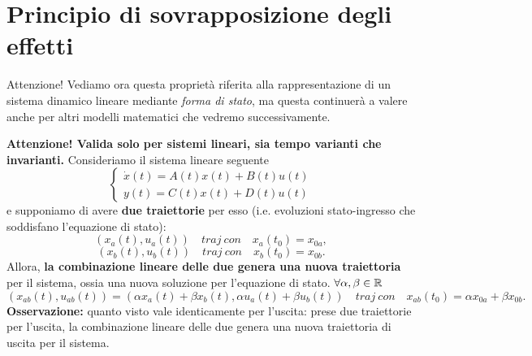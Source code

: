 \documentclass[a4paper]{report}
\begin{document}
\section{Principio di sovrapposizione degli effetti}
Attenzione! Vediamo ora questa proprietà riferita alla rappresentazione di un sistema dinamico lineare mediante\textit{ forma di stato}, ma questa continuerà a valere anche per altri modelli matematici che vedremo successivamente.
\bb
\begin{defin}{}{}
\textbf{Attenzione! Valida solo per sistemi lineari, sia tempo varianti che invarianti.}
	\bb
	Consideriamo il sistema lineare seguente
	\begin{equation*}
	\begin{cases}
		\dot x(t) = A(t)x(t) + B(t)u(t) \\
		y(t) = C(t)x(t) +D(t)u(t)
	\end{cases}
	\end{equation*}
	e supponiamo di avere \textbf{due traiettorie} per esso (i.e. evoluzioni stato-ingresso che soddisfano l'equazione di stato):
	\begin{equation*}
		(x_a(t), u_a(t))\quad traj \ con \quad  x_a(t_0)=x_{0a},
	\end{equation*}
		\begin{equation*}
		(x_b(t), u_b(t))\quad traj \ con \quad x_b(t_0)=x_{0b}.
	\end{equation*}
Allora, \textbf{la combinazione lineare delle due genera una nuova traiettoria} per il sistema, ossia una nuova soluzione per l'equazione di stato. $\forall \alpha, \beta \in \mathbb{R}$
	\begin{equation}
		(x_{ab}(t), u_{ab}(t)) = (\alpha x_a(t)+\beta x_b(t), \alpha u_a(t) + \beta u_b(t)) \quad traj \ con \quad x_{ab}(t_0) = \alpha x_{0a} + \beta x_{0b}.
	\end{equation}
\textbf{Osservazione:} quanto visto vale identicamente per l'uscita: prese due traiettorie per l'uscita, la combinazione lineare delle due genera una nuova traiettoria di uscita per il sistema.
\end{defin}
\end{document}
